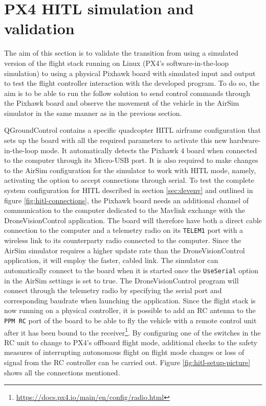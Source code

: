 \section{PX4 HITL simulation and validation}
\label{sec:test-4-hitl}


The aim of this section is to validate the transition from using a simulated version of the flight stack running on Linux (PX4's software-in-the-loop simulation) to using a physical Pixhawk board with simulated input and output to test the flight controller interaction with the developed program.
To do so, the aim is to be able to run the follow solution to send control commands through the Pixhawk board and observe the movement of the vehicle in the AirSim simulator in the same manner as in the previous section.


QGroundControl contains a specific quadcopter HITL airframe configuration that sets up the board with all the required parameters to activate this new hardware-in-the-loop mode.
It automatically detects the Pixhawk 4 board when connected to the computer through its Micro-USB port.
It is also required to make changes to the AirSim configuration for the simulator to work with HITL mode, namely, activating the option to accept connections through serial.
To test the complete system configuration for HITL described in section \ref{sec:devenv} and outlined in figure \ref{fig:hitl-connections}, the Pixhawk board needs an additional channel of communication to the computer dedicated to the Mavlink exchange with the DroneVisionControl application.
The board will therefore have both a direct cable connection to the computer and a telemetry radio on its \texttt{TELEM1} port with a wireless link to its counterparty radio connected to the computer.
Since the AirSim simulator requires a higher update rate than the DroneVisionControl application, it will employ the faster, cabled link.
The simulator can automatically connect to the board when it is started once the \texttt{UseSerial} option in the AirSim settings is set to true.
The DroneVisionControl program will connect through the telemetry radio by specifying the serial port and corresponding baudrate when launching the application.
Since the flight stack is now running on a physical controller, it is possible to add an RC antenna to the \texttt{PPM RC} port of the board to be able to fly the vehicle with a remote control unit after it has been bound to the receiver\footnote{\url{https://docs.px4.io/main/en/config/radio.html}}.
By configuring one of the switches in the RC unit to change to PX4's offboard flight mode, additional checks to the safety measures of interrupting autonomous flight on flight mode changes or loss of signal from the RC controller can be carried out.
Figure \ref{fig:hitl-setup-picture} shows all the connections mentioned.


